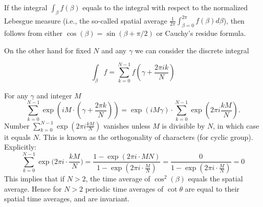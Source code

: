 If the integral $\int_\beta f(\beta)$ equals to the integral with respect to the normalized Lebesgue measure
(i.e., the so-called spatial average $\frac1{2\pi} \int_{\beta=0}^{2\pi} f(\beta) d\beta$),
then  
follows from either $\cos(\beta)=\sin(\beta+\pi/2)$ or Cauchy's residue formula.

On the other hand for fixed $N$ and any $\gamma$ we can consider the discrete integral

\[ \int_\beta f = \sum_{k=0}^{N-1} f(\gamma + \frac{2\pi i k}{N}) \]

For any $\gamma$ and integer $M$
\[ \sum_{k=0}^{N-1} \exp(i M \cdot (\gamma +\frac{2\pi k}{N}))
= \exp(i M \gamma) \cdot \sum_{k=0}^{N-1} \exp(2\pi i\frac{k M}{N}). \]
Number $\sum_{k=0}^{N-1} \exp(2\pi i\frac{k M}{N})$ vanishes unless $M$ is divisible by $N$,
in which case it equals $N$. 
This is known as the orthogonality of characters (for cyclic group). Explicitly:
\[ 
\sum_{k=0}^{N-1} \exp\big(2\pi i\cdot \frac{kM}{N}\big) 
= \frac{1-\exp(2\pi i\cdot MN)}{1-\exp(2\pi i\cdot\frac{M}{N})} 
= \frac0{1-\exp(2\pi i\cdot\frac{M}{N})} = 0 
\]
%
%
This implies that if $N>2$, the time average of $\cos^2(\beta)$ equals the spatial average.
Hence for $N>2$ periodic time averages of $\cot\theta$ are equal to their spatial time averages, and are invariant.
